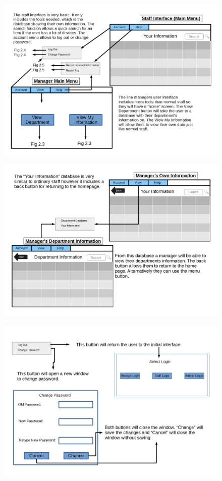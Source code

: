 \begin{figure}[H]
\includegraphics[width=\textwidth]{GUI_Design2.jpg}
\caption{}
\end{figure}

\begin{figure}[H]
\includegraphics[width=\textwidth]{GUI_Design3.jpg}
\caption{}
\end{figure}

\begin{figure}[H]
\includegraphics[width=\textwidth]{GUI_Design4.jpg}
\caption{}
\end{figure}

